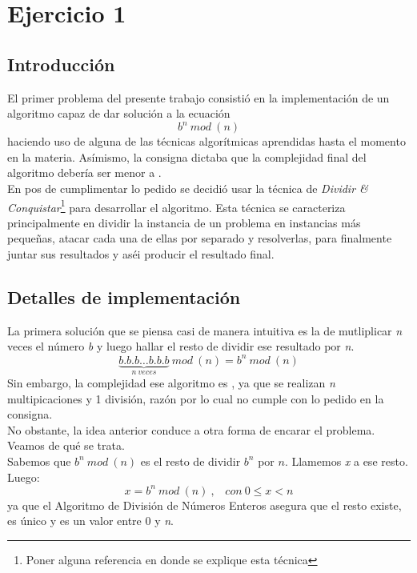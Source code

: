 \section*{Ejercicio 1}

\subsection*{Introducción}
	El primer problema del presente trabajo consistió en la implementación de un algoritmo capaz de dar solución a la ecuación 
	\begin{equation} 
		b^n\ mod\ (n) 
	\end{equation} 
haciendo uso de alguna de las técnicas algorítmicas aprendidas hasta el momento en la materia. Asímismo, la consigna dictaba que la complejidad final del algoritmo debería ser menor a .\\
	En pos de cumplimentar lo pedido se decidió usar la técnica de \textit{Dividir \& Conquistar}\footnote{Poner alguna referencia 	en donde se explique esta técnica} para desarrollar el algoritmo. Esta técnica se caracteriza principalmente en dividir la instancia de un problema en instancias más pequeñas, atacar cada una de ellas por separado y resolverlas, para finalmente juntar sus resultados y aséi producir el resultado final.

\subsection*{Detalles de implementación}
	La primera solución que se piensa casi de manera intuitiva es la de mutliplicar \textit{n} veces el número \textit{b} y luego hallar el resto de dividir ese resultado por \textit{n}. 
	\begin{equation}
		\underbrace{b.b.b \hdots b.b.b}_{n\ veces}\ mod\ (n)  = b^n\ mod\ (n)
	\end{equation}
Sin embargo, la complejidad ese algoritmo es , ya que se realizan \textit{n} multipicaciones y 1 división, razón por lo cual no cumple con lo pedido en la consigna.\\
No obstante, la idea anterior conduce a otra forma de encarar el problema. Veamos de qué se trata. \\

	Sabemos que $b^n\ mod\ (n)$ es el resto de dividir $b^n$ por $n$. Llamemos \textit{x} a ese resto. Luego: 
	\begin{equation}
		 x = b^n\ mod\ (n)\ , \hspace{10pt}con\ 0 \leq x < n
	\end{equation}
ya que el Algoritmo de División de Números Enteros asegura que el resto existe, es único y es un valor entre 0 y \textit{n}.\\


